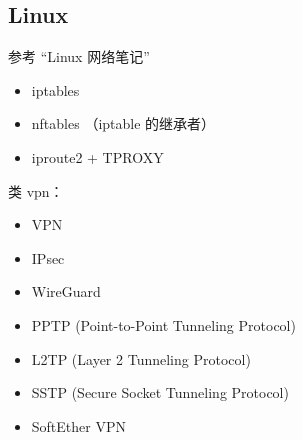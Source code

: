 \subsection{Linux}
参考 “Linux 网络笔记”
\begin{itemize}
\item iptables
\item nftables （iptable 的继承者）
\item iproute2 + TPROXY
\end{itemize}

类 vpn：
\begin{itemize}
\item VPN
\item IPsec
\item WireGuard
\item PPTP (Point-to-Point Tunneling Protocol)
\item L2TP (Layer 2 Tunneling Protocol)
\item SSTP (Secure Socket Tunneling Protocol)
\item SoftEther VPN
\end{itemize}

